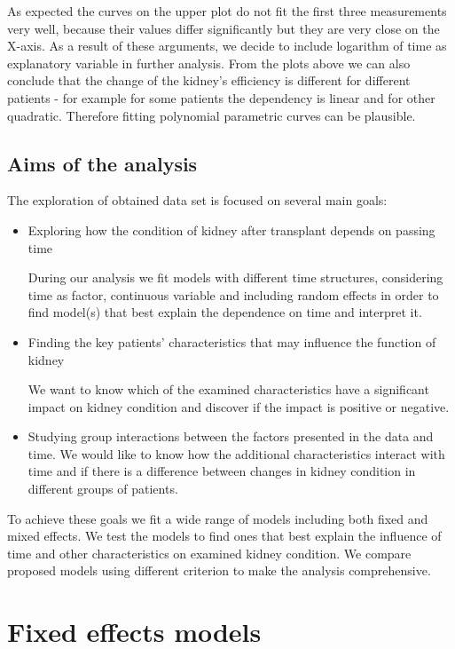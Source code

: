 \documentclass[num-refs]{wiley-article}
\begin{document}
As expected the curves on the upper plot do not fit the first three measurements very well, because their values differ significantly but they are very close on the X-axis. As a result of these arguments, we decide to include logarithm of time as explanatory variable in further analysis. From the plots above we can also conclude that the change of the kidney's efficiency is different for different patients - for example for some patients the dependency is linear and for other quadratic. Therefore fitting polynomial parametric curves can be plausible. 

\subsection{Aims of the analysis}
The exploration of obtained data set is focused on several main goals:
\begin{itemize}
\item Exploring how the condition of kidney after transplant depends on passing time

During our analysis we fit models with different time structures, considering time as factor, continuous variable and including random effects in order to find model(s) that best explain the dependence on time and interpret it.
\item Finding the key patients' characteristics that may influence the function of kidney

We want to know which of the examined characteristics have a significant impact on kidney condition and discover if the impact is positive or negative.
\item Studying group interactions between the factors presented in the data and time.
We would like to know how the additional characteristics interact with time and if there is a difference between changes in kidney condition in different groups of patients.


\end{itemize}
To achieve these goals we fit a wide range of models including both fixed and mixed effects. We test the models to find ones that best explain the influence of time and other characteristics on examined kidney condition. We compare proposed models using different criterion to make the analysis comprehensive.

\section{Fixed effects models}
\end{document}
